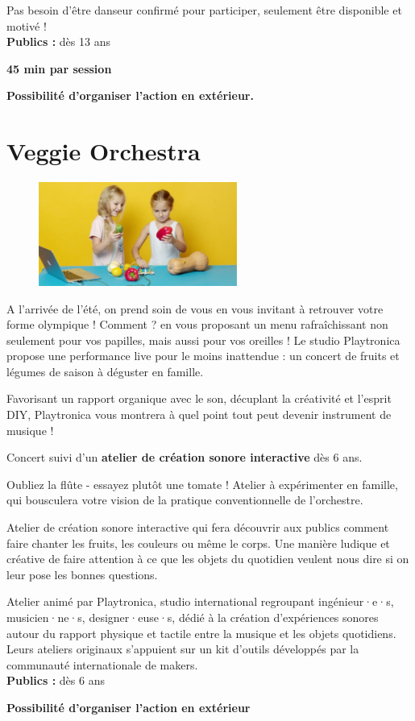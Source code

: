 \documentclass[fontsize=12pt]{scrartcl} %
\numberwithin{equation}{section} %
\numberwithin{table}{section} %
\begin{document}
Pas besoin d'être danseur confirmé pour participer, seulement être disponible et motivé !\\

\noindent
\textbf{Publics :} dès 13 ans

\noindent
\textbf{45 min par session}

\noindent 
\textbf{Possibilité d'organiser l'action en extérieur.}

\pagebreak

\section{Veggie Orchestra}
\label{app:veggie}

\begin{figure}
\centering
\includegraphics[width=6.5cm]{img/veggie}
\label{fig:veggie}
\end{figure}

A l'arrivée de l'été, on prend soin de vous en vous invitant à retrouver votre forme olympique ! Comment ? en vous proposant un menu rafraîchissant non seulement pour vos papilles, mais aussi pour vos oreilles ! Le studio Playtronica propose une performance live pour le moins inattendue : un concert de fruits et légumes de saison à déguster en famille.
 
Favorisant un rapport organique avec le son, décuplant la créativité et l'esprit DIY, Playtronica vous montrera à quel point tout peut devenir instrument de musique !
 
Concert suivi d'un \textbf{atelier de création sonore interactive} dès 6 ans.
 
Oubliez la flûte - essayez plutôt une tomate ! Atelier à expérimenter en famille, qui  bousculera votre vision de la  pratique conventionnelle de l'orchestre.
 
Atelier de création sonore interactive qui fera découvrir aux publics comment faire chanter les fruits, les couleurs ou même le corps. Une manière ludique et créative de faire attention à ce que les objets du quotidien veulent nous dire si on leur pose les bonnes questions.
 
Atelier animé par Playtronica, studio international regroupant ingénieur·e·s, musicien·ne·s, designer·euse·s, dédié à la création d'expériences sonores autour du rapport physique et tactile entre la musique et les objets quotidiens. Leurs ateliers originaux s'appuient sur un kit d'outils développés par la communauté internationale de makers.\\

\noindent
\textbf{Publics :} dès 6 ans

\noindent
\textbf{Possibilité d'organiser l'action en extérieur}
\end{document}
